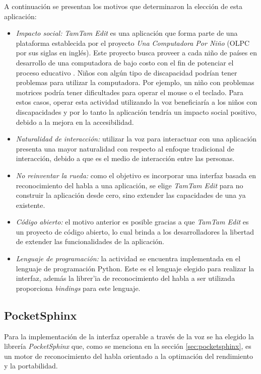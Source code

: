 A continuaci\'on se presentan los motivos que determinaron la elecci\'on de esta aplicaci\'on:

\begin{itemize}
    \item \emph{Impacto social:} \emph{TamTam Edit} es una aplicaci\'on que forma parte de una plataforma establecida por el
	proyecto \emph{Una Computadora Por Ni\~no} (OLPC por sus siglas en ingl\'es). Este proyecto busca proveer
	a cada ni\~no de pa\'ises en desarrollo de una computadora de bajo costo con el
	fin de potenciar el proceso educativo \cite{OLPC}. Ni\~nos con alg\'un tipo de discapacidad podr\'ian tener
	problemas para utilizar la computadora. Por ejemplo, un ni\~no con problemas motrices podr\'ia tener dificultades para operar el mouse
	o el teclado. Para estos casos, operar esta actividad utilizando la voz beneficiar\'ia a los ni\~nos con discapacidades
	y por lo tanto la aplicaci\'on tendr\'ia un impacto social positivo, debido a la mejora en la accesibilidad.
    \item \emph{Naturalidad de interacci\'on:} utilizar la voz para interactuar con una aplicaci\'on presenta una mayor
	naturalidad con respecto al enfoque tradicional de interacci\'on, debido a que es el medio de
	interacci\'on entre las personas.
    \item \emph{No reinventar la rueda:} como el objetivo es incorporar una interfaz basada en reconocimiento del habla a una aplicaci\'on,
	se elige \emph{TamTam Edit} para no construir la aplicaci\'on desde cero, sino extender las capacidades de una ya existente.
    \item \emph{C\'odigo abierto:} el motivo anterior es posible gracias a que \emph{TamTam Edit} es un proyecto de c\'odigo abierto, lo cual
	brinda a los desarrolladores la libertad de extender las funcionalidades de la aplicaci\'on.
    \item \emph{Lenguaje de programaci\'on:} la actividad se encuentra implementada en el lenguaje de programaci\'on Python. Este es el
	lenguaje elegido para realizar la interfaz, adem\'as la librer'ia de reconocimiento del habla a ser utilizada proporciona
	\emph{bindings} para este lenguaje.
\end{itemize}



\subsection{PocketSphinx}

Para la implementaci\'on de la interfaz operable a trav\'es de la voz se ha elegido la librer\'ia \emph{PocketSphinx} que,
como se menciona en la secci\'on \ref{sec:pocketsphinx}, es un motor de reconocimiento del habla orientado a la optimaci\'on
del rendimiento y la portabilidad.

